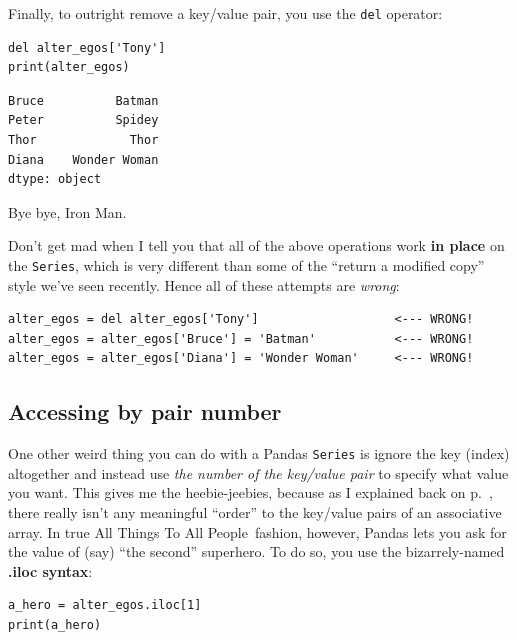 Finally, to outright remove a key/value pair, you use the \texttt{del}
operator:

\begin{Verbatim}[fontsize=\small,samepage=true,frame=single,framesep=3mm]
del alter_egos['Tony']
print(alter_egos)
\end{Verbatim}

\begin{Verbatim}[fontsize=\small,samepage=true,frame=leftline,framesep=5mm,framerule=1mm]
Bruce          Batman
Peter          Spidey
Thor             Thor
Diana    Wonder Woman
dtype: object
\end{Verbatim}

Bye bye, Iron Man.


Don't get mad when I tell you that all of the above operations work
\textbf{in place} on the \texttt{Series}, which is very different than some of
the ``return a modified copy'' style we've seen recently. Hence all of these
attempts are \textit{wrong}:

\begin{Verbatim}[fontsize=\small,samepage=true,frame=single,framesep=3mm]
alter_egos = del alter_egos['Tony']                   <--- WRONG!
alter_egos = alter_egos['Bruce'] = 'Batman'           <--- WRONG!
alter_egos = alter_egos['Diana'] = 'Wonder Woman'     <--- WRONG!
\end{Verbatim}

\subsection{Accessing by pair number}



One other weird thing you can do with a Pandas \texttt{Series} is ignore the
key (index) altogether and instead use \textit{the number of the key/value
pair} to specify what value you want. This gives me the heebie-jeebies, because
as I explained back on p.~\pageref{assocArraysUnordered}, there really isn't
any meaningful ``order'' to the key/value pairs of an associative array. In
true All Things To All People\texttrademark~fashion, however, Pandas lets you
ask for the value of (say) ``the second'' superhero. To do so, you use the
bizarrely-named \textbf{.iloc syntax}:

\begin{Verbatim}[fontsize=\small,samepage=true,frame=single,framesep=3mm]
a_hero = alter_egos.iloc[1]
print(a_hero)
\end{Verbatim}

